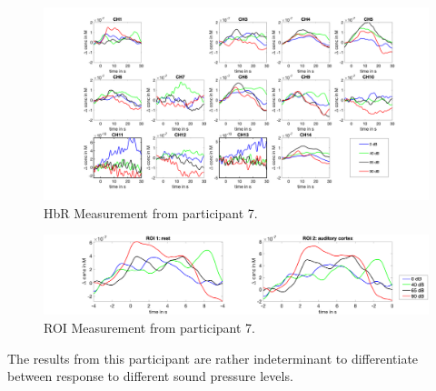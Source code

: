 \begin{figure}[H]
  \centering
    \includegraphics[scale=.4]{bilder/HbR_Mole/sub_liao_s_HbR.png}
  \caption{HbR Measurement from participant 7.}
  \label{fig:somesignal}
\end{figure}

\begin{figure}[H]
  \centering
    \includegraphics[scale=.29]{bilder/ROI/sub_liao_s_HbO.png}
  \caption{ROI Measurement from participant 7.}
\end{figure}

The results from this participant are rather indeterminant to differentiate between response to different sound pressure levels.

\newpage









